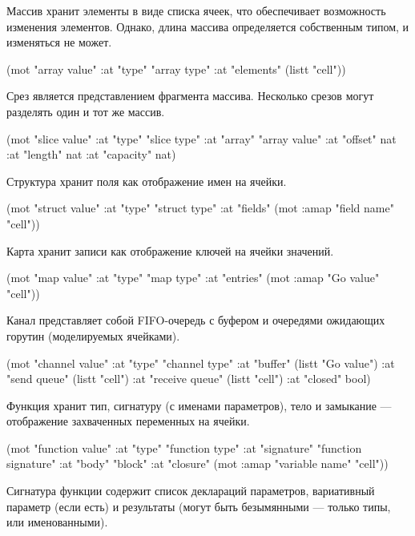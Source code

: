 \documentclass[12pt,twoside,russian]{article}
\begin{document}
Массив хранит элементы в виде списка ячеек, что обеспечивает возможность изменения элементов. Однако, длина массива определяется собственным типом, и изменяться не может.

\begin{ABMLCode}
(mot "array value" 
	:at "type"     "array type" 
	:at "elements" (listt "cell"))
\end{ABMLCode}

Срез является представлением фрагмента массива. Несколько срезов могут разделять 
один и тот же массив.

\begin{ABMLCode}
(mot "slice value" 
	:at "type"     "slice type" 
	:at "array"    "array value" 
	:at "offset"   nat 
	:at "length"   nat 
	:at "capacity" nat)
\end{ABMLCode}

Структура хранит поля как отображение имен на ячейки.

\begin{ABMLCode}
(mot "struct value" 
	:at "type"   "struct type" 
	:at "fields" (mot :amap "field name" "cell"))
\end{ABMLCode}

Карта хранит записи как отображение ключей на ячейки значений.

\begin{ABMLCode}
(mot "map value" 
	:at "type"    "map type" 
	:at "entries" (mot :amap "Go value" "cell"))
\end{ABMLCode}

Канал представляет собой FIFO-очередь с буфером и очередями ожидающих горутин (моделируемых ячейками).

\begin{ABMLCode}
(mot "channel value" 
	:at "type"          "channel type" 
	:at "buffer"        (listt "Go value") 
	:at "send queue"    (listt "cell") 
	:at "receive queue" (listt "cell") 
	:at "closed"        bool)
\end{ABMLCode}

Функция хранит тип, сигнатуру (с именами параметров), тело и замыкание — отображение захваченных переменных на ячейки.

\begin{ABMLCode}
(mot "function value" 
	:at "type"      "function type" 
	:at "signature" "function signature" 
	:at "body"      "block" 
	:at "closure"   (mot :amap "variable name" "cell"))
\end{ABMLCode}

Сигнатура функции содержит список деклараций параметров, вариативный параметр 
(если есть) и результаты (могут быть безымянными — только типы, или именованными).
\end{document}
